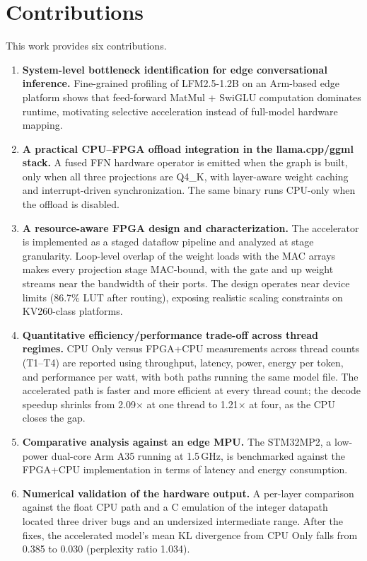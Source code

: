 \section{Contributions}
\label{sec:contribution}
This work provides six contributions.

\begin{enumerate}
    \item \textbf{System-level bottleneck identification for edge conversational inference.}
    Fine-grained profiling of LFM2.5-1.2B on an Arm-based edge platform shows that
    feed-forward MatMul + SwiGLU computation dominates runtime, motivating selective
    acceleration instead of full-model hardware mapping.

    \item \textbf{A practical CPU--FPGA offload integration in the llama.cpp/ggml stack.}
    A fused FFN hardware operator is emitted when the graph is built, only when all
    three projections are Q4\_K, with layer-aware weight caching and interrupt-driven
    synchronization. The same binary runs CPU-only when the offload is disabled.

    \item \textbf{A resource-aware FPGA design and characterization.}
    The accelerator is implemented as a staged dataflow pipeline and analyzed at
    stage granularity. Loop-level overlap of the weight loads with the MAC arrays
    makes every projection stage MAC-bound, with the gate and up weight streams near
    the bandwidth of their ports. The design operates near device limits (86.7\% LUT
    after routing), exposing realistic scaling constraints on KV260-class platforms.

    \item \textbf{Quantitative efficiency/performance trade-off across thread regimes.}
    CPU Only versus FPGA+CPU measurements across thread counts (T1--T4) are reported
    using throughput, latency, power, energy per token, and performance per watt, with
    both paths running the same model file. The accelerated path is faster and more
    efficient at every thread count; the decode speedup shrinks from 2.09$\times$ at
    one thread to 1.21$\times$ at four, as the CPU closes the gap.

    \item \textbf{Comparative analysis against an edge MPU.}
    The STM32MP2, a low-power dual-core Arm A35 running at 1.5\,GHz, is benchmarked
    against the FPGA+CPU implementation in terms of latency and energy consumption.

    \item \textbf{Numerical validation of the hardware output.}
    A per-layer comparison against the float CPU path and a C emulation of the
    integer datapath located three driver bugs and an undersized intermediate range.
    After the fixes, the accelerated model's mean KL divergence from CPU Only falls
    from 0.385 to 0.030 (perplexity ratio 1.034).
\end{enumerate}

